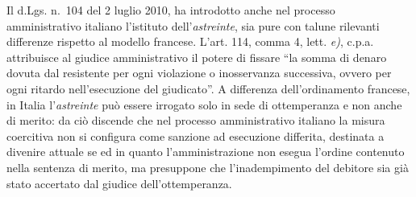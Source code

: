 \documentclass[12pt,it,a4paper,]{report}
\begin{document}
Il d.Lgs. n.~104 del 2 luglio 2010, ha introdotto anche nel processo
amministrativo italiano l'istituto dell'\emph{astreinte}, sia pure con
talune rilevanti differenze rispetto al modello francese. L'art. 114,
comma 4, lett. \emph{e)}, c.p.a. attribuisce al giudice amministrativo
il potere di fissare ``la somma di denaro dovuta dal resistente per ogni
violazione o inosservanza successiva, ovvero per ogni ritardo
nell'esecuzione del giudicato''. A differenza dell'ordinamento francese,
in Italia l'\emph{astreinte} può essere irrogato solo in sede di
ottemperanza e non anche di merito: da ciò discende che nel processo
amministrativo italiano la misura coercitiva non si configura come
sanzione ad esecuzione differita, destinata a divenire attuale se ed in
quanto l'amministrazione non esegua l'ordine contenuto nella sentenza di
merito, ma presuppone che l'inadempimento del debitore sia già stato
accertato dal giudice dell'ottemperanza.
\end{document}
